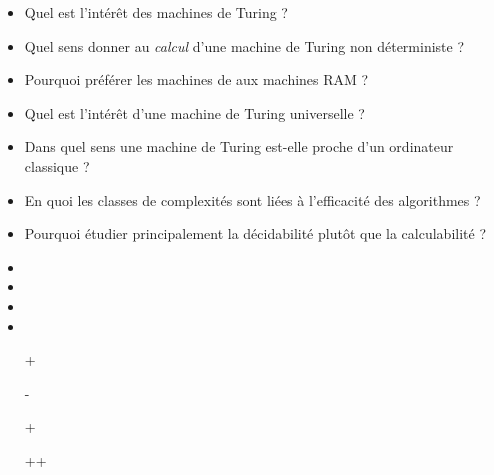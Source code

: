 \documentclass{agregfiche}
\begin{document}
\secquestionsclassiques

\begin{itemize}
    \item Quel est l'intérêt des machines de Turing ?
    \item Quel sens donner au \emph{calcul} d'une machine de Turing non
        déterministe ?
    \item Pourquoi préférer les machines de  aux machines RAM ?
    \item Quel est l'intérêt d'une machine de Turing universelle ?
    \item Dans quel sens une machine de Turing est-elle proche d'un ordinateur
        classique ?
    \item En quoi les classes de complexités sont liées à l'efficacité des
        algorithmes ?
    \item Pourquoi étudier principalement la décidabilité plutôt que la
        calculabilité ?
\end{itemize}

\secreferences

\begin{itemize}
    \item 
    \item 
    \item 
    \item 
\end{itemize}


\secdev

\begin{itemize}
    \item[+] 
    \item[-] 
    \item[+] 
    \item[++] 

\end{itemize}
\end{document}

